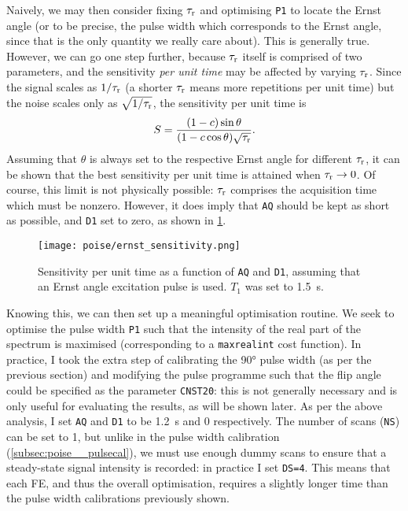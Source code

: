 Naively, we may then consider fixing $\tau_\mathrm{r}$ and optimising \texttt{P1} to locate the Ernst angle (or to be precise, the pulse width which corresponds to the Ernst angle, since that is the only quantity we really care about).
This is generally true.
However, we can go one step further, because $\tau_\mathrm{r}$ itself is comprised of two parameters, and the sensitivity \textit{per unit time} may be affected by varying $\tau_\mathrm{r}$.
Since the signal scales as $1/\tau_\mathrm{r}$ (a shorter $\tau_\mathrm{r}$ means more repetitions per unit time) but the noise scales only as $\sqrt{1/\tau_\mathrm{r}}$, the sensitivity per unit time is
\begin{equation}
    \label{eq:z_magn_ernst5}
    S = \frac{(1 - c)\sin\theta}{(1 - c\cos\theta)\sqrt{\tau_\mathrm{r}}}.
\end{equation}
Assuming that $\theta$ is always set to the respective Ernst angle for different $\tau_\mathrm{r}$, it can be shown that the best sensitivity per unit time is attained when $\tau_\mathrm{r} \to 0$.\autocite{Waugh1970JMS,Traficante1992CMR}
Of course, this limit is not physically possible: $\tau_\mathrm{r}$ comprises the acquisition time which must be nonzero.
However, it does imply that \texttt{AQ} should be kept as short as possible, and \texttt{D1} set to zero, as shown in \cref{fig:ernst_sensitivity}.

\begin{figure}[htb]
    \centering
    \texttt{[image: poise/ernst\_sensitivity.png]}
    \caption[Sensitivity per unit time as a function of \texttt{AQ} and \texttt{D1}]{Sensitivity per unit time as a function of \texttt{AQ} and \texttt{D1}, assuming that an Ernst angle excitation pulse is used. $T_1$ was set to \SI{1.5}{\s}.}
    \label{fig:ernst_sensitivity}
\end{figure}

Knowing this, we can then set up a meaningful optimisation routine.
We seek to optimise the pulse width \texttt{P1} such that the intensity of the real part of the spectrum is maximised (corresponding to a \texttt{maxrealint} cost function).
In practice, I took the extra step of calibrating the \ang{90} pulse width (as per the previous section) and modifying the pulse programme such that the flip angle could be specified as the parameter \texttt{CNST20}: this is not generally necessary and is only useful for evaluating the results, as will be shown later.
As per the above analysis, I set \texttt{AQ} and \texttt{D1} to be \SI{1.2}{\s} and 0 respectively.
The number of scans (\texttt{NS}) can be set to 1, but unlike in the pulse width calibration (\cref{subsec:poise__pulsecal}), we must use enough dummy scans to ensure that a steady-state signal intensity is recorded: in practice I set \texttt{DS=4}.
This means that each FE, and thus the overall optimisation, requires a slightly longer time than the pulse width calibrations previously shown.


